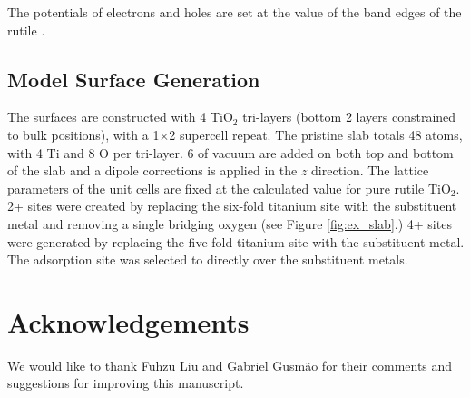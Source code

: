The potentials of electrons and holes are set at the value of the band edges of the rutile \cite{Nozik_1996}.

\subsection{Model Surface Generation}
 The surfaces are constructed with 4 TiO$_2$ tri-layers (bottom 2 layers constrained to bulk positions), with a 1$\times$2 supercell repeat. The pristine slab totals 48 atoms, with 4 Ti and 8 O per tri-layer. 6 \A{} of vacuum are added on both top and bottom of the slab and a dipole corrections is applied in the $z$ direction\cite{Dipole_paper}. The lattice parameters of the unit cells are fixed at the calculated value for pure rutile TiO$_2$. 2+ sites were created by replacing the six-fold titanium site with the substituent metal and removing a single bridging oxygen (see Figure \ref{fig:ex_slab}.) 4+ sites were generated by replacing the five-fold titanium site with the substituent metal. The adsorption site was selected to directly over the substituent metals. 

\section{Acknowledgements}
We would like to thank Fuhzu Liu and Gabriel Gusm\~ao for their comments and suggestions for improving this manuscript.



\appendix



